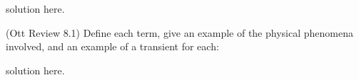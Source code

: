 \documentclass[11pt,addpoints,answers]{exam}
\begin{document}
\begin{questions}
        \begin{solution}
                solution here.
        \end{solution}

        \question[15] (Ott Review 8.1) Define each term, give an example of the 
        physical phenomena involved, and an example of a transient for each: 
        \begin{solution}
                solution here.
        \end{solution}
       
       
\end{questions}



%
%
\end{document}
